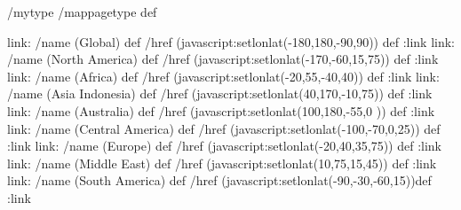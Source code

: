 \begin{ingrid}
/mytype /mappagetype def

link:
/name (Global) def
/href (javascript:setlonlat(-180,180,-90,90)) def
:link
link:
/name (North America) def
/href (javascript:setlonlat(-170,-60,15,75)) def
:link
link:
/name (Africa) def
/href (javascript:setlonlat(-20,55,-40,40)) def
:link
link:
/name (Asia Indonesia) def
/href (javascript:setlonlat(40,170,-10,75)) def
:link
link:
/name (Australia) def
/href (javascript:setlonlat(100,180,-55,0 )) def
:link
link:
/name (Central America) def
/href (javascript:setlonlat(-100,-70,0,25)) def
:link
link:
/name (Europe) def
/href (javascript:setlonlat(-20,40,35,75)) def
:link
link:
/name (Middle East) def
/href (javascript:setlonlat(10,75,15,45)) def
:link
link:
/name (South America) def
/href (javascript:setlonlat(-90,-30,-60,15))def
:link
\end{ingrid}
